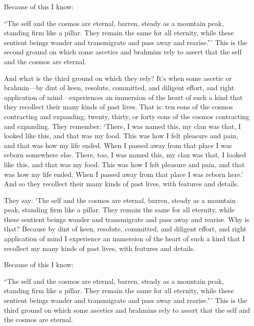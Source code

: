 \documentclass[12pt,openany]{book}%
\begin{document}
Because of this I know: 

“The self and the cosmos are eternal, barren, steady as a mountain peak, standing firm like a pillar. They remain the same for all eternity, while these sentient beings wander and transmigrate and pass away and rearise.”’ This is the second ground on which some ascetics and brahmins rely to assert that the self and the cosmos are eternal. 

And what is the third ground on which they rely? It’s when some ascetic or brahmin—by dint of keen, resolute, committed, and diligent effort, and right application of mind—experiences an immersion of the heart of such a kind that they recollect their many kinds of past lives. That is: ten eons of the cosmos contracting and expanding; twenty, thirty, or forty eons of the cosmos contracting and expanding. They remember: ‘There, I was named this, my clan was that, I looked like this, and that was my food. This was how I felt pleasure and pain, and that was how my life ended. When I passed away from that place I was reborn somewhere else. There, too, I was named this, my clan was that, I looked like this, and that was my food. This was how I felt pleasure and pain, and that was how my life ended. When I passed away from that place I was reborn here.’ And so they recollect their many kinds of past lives, with features and details. 

They say: ‘The self and the cosmos are eternal, barren, steady as a mountain peak, standing firm like a pillar. They remain the same for all eternity, while these sentient beings wander and transmigrate and pass away and rearise. Why is that? Because by dint of keen, resolute, committed, and diligent effort, and right application of mind I experience an immersion of the heart of such a kind that I recollect my many kinds of past lives, with features and details. 

Because of this I know: 

“The self and the cosmos are eternal, barren, steady as a mountain peak, standing firm like a pillar. They remain the same for all eternity, while these sentient beings wander and transmigrate and pass away and rearise.”’ This is the third ground on which some ascetics and brahmins rely to assert that the self and the cosmos are eternal. 
\end{document}
